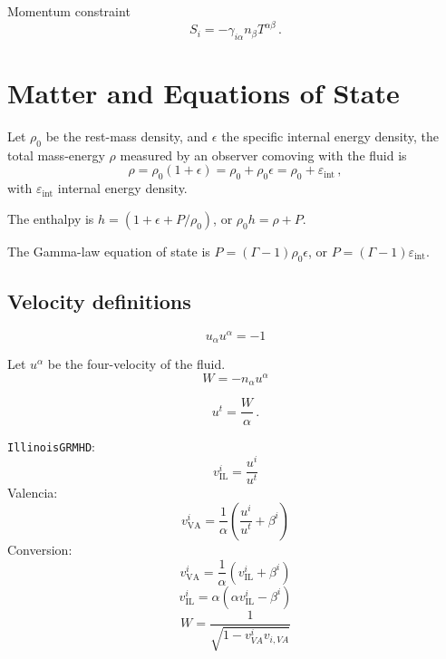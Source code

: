 \documentclass[]{scrartcl}
\begin{document}
Momentum constraint
\begin{equation}
  \label{eq:9}
  S_i = - \gamma_{i\alpha} n_\beta T^{\alpha\beta}\,.
\end{equation}

\section{Matter and Equations of State}
\label{sec:matter}

Let $\rho_0$ be the rest-mass density, and $\epsilon$ the specific internal energy
density, the total mass-energy $\rho$ measured by an observer comoving with the
fluid is
\begin{equation}
  \label{eq:6}
  \rho = \rho_0 (1 + \epsilon) = \rho_0 + \rho_0 \epsilon = \rho_0 + \varepsilon_{\text{int}}\,,
\end{equation}
with $\varepsilon_{\text{int}}$ internal energy density.

The enthalpy is $h = (1 + \epsilon + P\slash \rho_0)$, or $\rho_0 h = \rho + P$.

The Gamma-law equation of state is $P = (\Gamma - 1) \rho_0 \epsilon$, or $P = (\Gamma - 1) \varepsilon_{\text{int}}$.


\subsection{Velocity definitions}
\label{sec:velocity-definitions}

\begin{equation}
  \label{eq:19}
  u_\alpha u^\alpha = -1
\end{equation}

Let $u^\alpha$ be the four-velocity of the fluid.
\begin{equation}
  \label{eq:10}
  W = -n_\alpha u^\alpha
\end{equation}

\begin{equation}
  \label{eq:7}
  u^t = \frac{W}{\alpha}\,.
\end{equation}

\texttt{IllinoisGRMHD}:
\begin{equation}
  \label{eq:13}
  v^i_{\text{IL}} = \frac{u^i}{u^t}
\end{equation}
Valencia:
\begin{equation}
  \label{eq:14}
  v^i_{\text{VA}} = \frac{1}{\alpha} \left( \frac{u^i}{u^t} + \beta^i \right)
\end{equation}
Conversion:
\begin{equation}
  \label{eq:15}
  v^i_{\text{VA}} = \frac{1}{\alpha} \left( v^i_{\text{IL}} + \beta^i \right)
\end{equation}
\begin{equation}
  \label{eq:15}
  v^i_{\text{IL}} = {\alpha} \left( \alpha v^i_{\text{IL}} - \beta^i \right)
\end{equation}
\begin{equation}
  \label{eq:20}
  W = \frac{1}{\sqrt{1 - v^i_{VA} v_{i,VA}}}
\end{equation}
\end{document}
